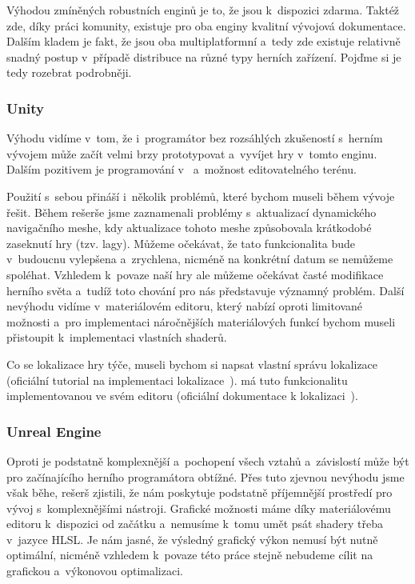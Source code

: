 Výhodou zmíněných robustních enginů je to, že jsou k~dispozici zdarma. Taktéž zde, díky práci komunity, existuje pro oba enginy kvalitní vývojová dokumentace. Dalším kladem je fakt, že jsou oba multiplatformní a~tedy zde existuje relativně snadný postup v~případě distribuce na různé typy herních zařízení. Pojďme si je tedy rozebrat podrobněji.

\subsubsection{Unity}
Výhodu \UN{} vidíme v~tom, že i~programátor bez rozsáhlých zkušeností s~herním vývojem může začít velmi brzy prototypovat a~vyvíjet hry v~tomto enginu. Dalším pozitivem je programování v~\CS{} a~možnost editovatelného terénu.

Použití \UN{} s~sebou přináší i~několik problémů, které bychom museli během vývoje řešit. Během rešerše jsme zaznamenali problémy s~aktualizací dynamického navigačního meshe, kdy aktualizace tohoto meshe způsobovala krátkodobé zaseknutí hry (tzv. lagy). Můžeme očekávat, že tato funkcionalita bude v~budoucnu vylepšena a~zrychlena, nicméně na konkrétní datum se nemůžeme spoléhat. Vzhledem k~povaze naší hry ale můžeme očekávat časté modifikace herního světa a~tudíž toto chování pro nás představuje významný problém. Další nevýhodu vidíme v~materiálovém editoru, který nabízí oproti \UE{} limitované možnosti a~pro implementaci náročnějších materiálových funkcí bychom museli přistoupit k~implementaci vlastních shaderů.

Co se lokalizace hry týče, museli bychom si napsat vlastní správu lokalizace (oficiální tutorial na implementaci lokalizace~\citep{unity_loc}). \UE{} má tuto funkcionalitu implementovanou ve svém editoru (oficiální dokumentace k lokalizaci~\citep{ue_loc}).


\subsubsection{Unreal Engine}
Oproti \UN{} je \UE{} podstatně komplexnější a~pochopení všech vztahů a~závislostí může být pro začínajícího herního programátora obtížné. Přes tuto zjevnou nevýhodu jsme však běhe, rešerš zjistili, že \UE{} nám poskytuje podstatně příjemnější prostředí pro vývoj s~komplexnějšími nástroji. Grafické možnosti máme díky materiálovému editoru k~dispozici od začátku a~nemusíme k~tomu umět psát shadery třeba v~jazyce HLSL. Je nám jasné, že výsledný grafický výkon nemusí být nutně optimální, nicméně vzhledem k~povaze této práce stejně nebudeme cílit na grafickou a~výkonovou optimalizaci.

